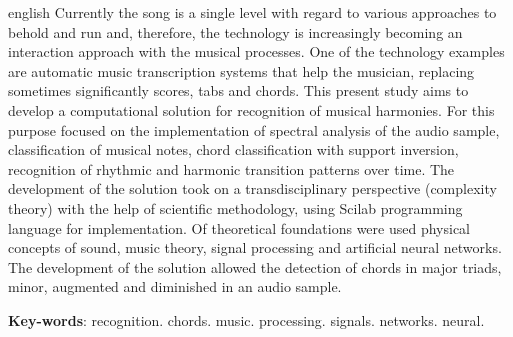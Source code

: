 \begin{resumo}[Abstract]
 \begin{otherlanguage*}{english}
   Currently the song is a single level with regard to various approaches to behold and run and, therefore, the technology is increasingly becoming an interaction approach with the musical processes. One of the technology examples are automatic music transcription systems that help the musician, replacing sometimes significantly scores, tabs and chords. This present study aims to develop a computational solution for recognition of musical harmonies. For this purpose focused on the implementation of spectral analysis of the audio sample, classification of musical notes, chord classification with support inversion, recognition of rhythmic and harmonic transition patterns over time. The development of the solution took on a transdisciplinary perspective (complexity theory) with the help of scientific methodology, using Scilab programming language for implementation. Of theoretical foundations were used physical concepts of sound, music theory, signal processing and artificial neural networks. The development of the solution allowed the detection of chords in major triads, minor, augmented and diminished in an audio sample.

   \vspace{\onelineskip}

   \noindent
   \textbf{Key-words}: recognition. chords. music. processing. signals. networks. neural.
 \end{otherlanguage*}
\end{resumo}
